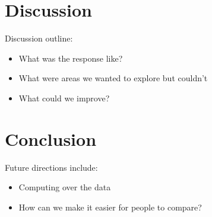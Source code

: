 \documentclass[journal]{vgtc}                %
\begin{document}
\section{Discussion}
Discussion outline:
\begin{itemize}
  \item What was the response like?
  \item What were areas we wanted to explore but couldn't
  \item What could we improve?
\end{itemize}

\section{Conclusion}

Future directions include:
\begin{itemize}
  \item Computing over the data
  \item How can we make it easier for people to compare?
\end{itemize}


%

%
%
%


\end{document}
